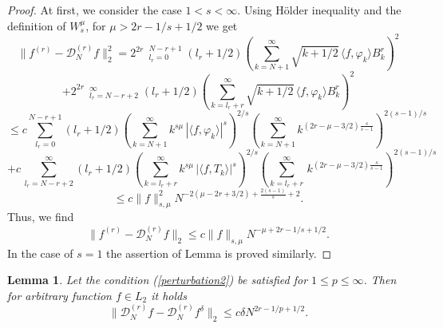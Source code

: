 \documentclass[10pt]{extarticle}
\newtheorem{lemma}[theorem]{Lemma}
\begin{document}
\begin{proof}
At first, we consider the case $1<s<\infty$. Using Hölder inequality and the definition of $W^\mu_s$, for $\mu>2r-1/s+1/2$ we get
$$
\|f^{(r)}-\mathcal{D}^{(r)}_N f\|^2_{2}
= 2^{2r}\, \mathop{{\sum}^*}_{l_{r}=0}^{N-r+1} (l_r+1/2)
\left(\sum_{k=N+1}^ \infty \sqrt{k+1/2}\, \langle f, \varphi_{k} \rangle B^r_{k}\right)^2
$$
$$
+ 2^{2r}\, \mathop{{\sum}^*}_{l_{r}=N-r+2}^{\infty}(l_r+1/2)
\left(\sum_{k=l_r+r}^\infty \sqrt{k+1/2}\, \langle f, \varphi_{k} \rangle B^r_{k}\right)^2
$$
$$
\leq c \mathop{{\sum}}\limits_{l_{r}=0}^{N-r+1} (l_r+1/2)
\left(\sum_{k=N+1}^\infty k^{s\mu}\, |\langle f, \varphi_{k} \rangle |^s\right)^{2/s}
\left(\sum_{k=N+1}^\infty k^{(2r-\mu-3/2)\frac{s}{s-1}}\right)^{2(s-1)/s}
$$
$$
+ c\, \mathop{{\sum}}\limits_{l_{r}=N-r+2}^{\infty} (l_r+1/2)
\left(\sum_{k=l_r+r}^\infty k^{s\mu}\, |\langle f, T_{k} \rangle |^s\right)^{2/s}
\left(\sum_{k=l_r+r}^\infty \, k^{(2r-\mu-3/2)\frac{s}{s-1}}\right)^{2(s-1)/s}
$$
$$
\leq c \|f\|_{s,\mu}^2 N^{-2(\mu-2r+3/2)+\frac{2(s-1)}{s}+2}.
$$
Thus, we find
$$
\|f^{(r)}-\mathcal{D}^{(r)}_N f\|_2 \leq c\|f\|_{s,\mu} N^{-\mu+2r-1/s+1/2}.
$$
In the case of $s = 1$ the assertion of Lemma is proved similarly.
\end{proof}

\begin{lemma}\label{lemma_BoundPertHC}
Let the condition (\ref{perturbation2}) be satisfied for $1\le p\le \infty$.
Then for arbitrary function $f\in L_2$ it holds
	$$
	\|\mathcal{D}^{(r)}_N f - \mathcal{D}^{(r)}_N f^\delta\|_2 \leq c\delta N^{2r-1/p+1/2}.
	$$
\end{lemma}
\end{document}
